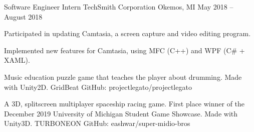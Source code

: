 \documentclass[]{awesome-cv}
\begin{document}
	\vspace{-4mm}
	\cventry
	{Software Engineer Intern}
	{TechSmith Corporation}
	{Okemos, MI}
	{May 2018 – August 2018}
	{\begin{cvitems}
		\item {Participated in updating Camtasia, a screen capture and video editing program.}
		\item {Implemented new features for Camtasia, using MFC (C++) and WPF (C\# + XAML).}
	\end{cvitems}}



\vspace{-6mm}
\vspace{-2mm}

	\cventry
	{Music education puzzle game that teaches the player about drumming.
	 Made with Unity2D.}
	{GridBeat}
	{GitHub: projectlegato/projectlegato}
	{}
	{}

	\vspace{-6mm}
	\cventry
	{A 3D, splitscreen multiplayer spaceship racing game. First place winner of the December 2019 University of Michigan Student Game Showcase.
	 Made with Unity3D.}
	{TURBONEON}
	{GitHub: eashwar/super-midio-bros}
	{}
	{}
\end{document}
